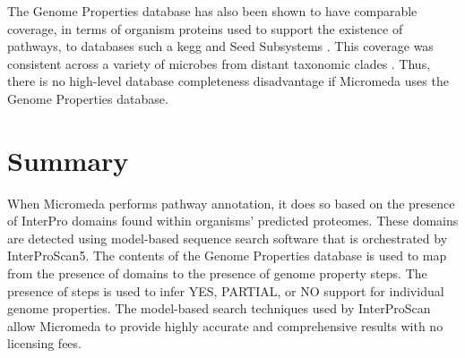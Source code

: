 The Genome Properties database has also been shown to have comparable coverage, in terms of organism proteins used to support the existence of pathways, to databases such a \gls{kegg} and Seed Subsystems \cite{richardson2018genome}. This coverage was consistent across a variety of microbes from distant taxonomic clades \cite{richardson2018genome}. Thus, there is no high-level database completeness disadvantage if Micromeda uses the Genome Properties database. 

\section{Summary}

When Micromeda performs pathway annotation, it does so based on the presence of InterPro domains found within organisms' predicted proteomes. These domains are detected using model-based sequence search software that is orchestrated by InterProScan5. The contents of the Genome Properties database is used to map from the presence of domains to the presence of genome property steps. The presence of steps is used to infer YES, PARTIAL, or NO support for individual genome properties. The model-based search techniques used by InterProScan allow Micromeda to provide highly accurate and comprehensive results with no licensing fees.